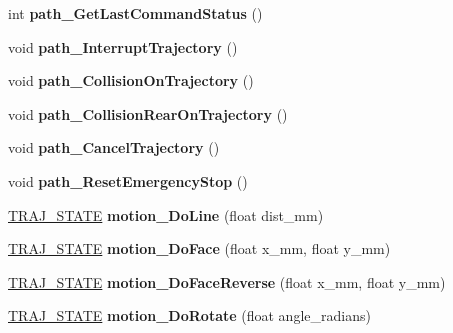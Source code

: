 \begin{DoxyCompactItemize}
\item 
\mbox{\label{classAsservN_a5dae80a7ffeae26c75751f9d7b362ee0}} 
int {\bfseries path\+\_\+\+Get\+Last\+Command\+Status} ()
\item 
\mbox{\label{classAsservN_a5d9332e9a4a1e13dd5fe7db3efce1871}} 
void {\bfseries path\+\_\+\+Interrupt\+Trajectory} ()
\item 
\mbox{\label{classAsservN_ae792ee21d684342dc24fa250626b6d4e}} 
void {\bfseries path\+\_\+\+Collision\+On\+Trajectory} ()
\item 
\mbox{\label{classAsservN_ad8864802fc5af8bdcc3adb36d41765b8}} 
void {\bfseries path\+\_\+\+Collision\+Rear\+On\+Trajectory} ()
\item 
\mbox{\label{classAsservN_a9183fcf2290bd2edcf13b741019dafa3}} 
void {\bfseries path\+\_\+\+Cancel\+Trajectory} ()
\item 
\mbox{\label{classAsservN_abbb9dda662c12fd5dca2fa89b670badd}} 
void {\bfseries path\+\_\+\+Reset\+Emergency\+Stop} ()
\item 
\mbox{\label{classAsservN_aa3f100a30f787da350a4a9e1cd35a9ea}} 
\hyperlink{path__manager_8h_adb3360abeb29758da93865c8afcb80eb}{T\+R\+A\+J\+\_\+\+S\+T\+A\+TE} {\bfseries motion\+\_\+\+Do\+Line} (float dist\+\_\+mm)
\item 
\mbox{\label{classAsservN_a64c4b711769055b61f75b47636d894bb}} 
\hyperlink{path__manager_8h_adb3360abeb29758da93865c8afcb80eb}{T\+R\+A\+J\+\_\+\+S\+T\+A\+TE} {\bfseries motion\+\_\+\+Do\+Face} (float x\+\_\+mm, float y\+\_\+mm)
\item 
\mbox{\label{classAsservN_ab1598b909531730c1c1ca5b4df5ada50}} 
\hyperlink{path__manager_8h_adb3360abeb29758da93865c8afcb80eb}{T\+R\+A\+J\+\_\+\+S\+T\+A\+TE} {\bfseries motion\+\_\+\+Do\+Face\+Reverse} (float x\+\_\+mm, float y\+\_\+mm)
\item 
\mbox{\label{classAsservN_ae2858d510206135f10dcf02cb44de1cd}} 
\hyperlink{path__manager_8h_adb3360abeb29758da93865c8afcb80eb}{T\+R\+A\+J\+\_\+\+S\+T\+A\+TE} {\bfseries motion\+\_\+\+Do\+Rotate} (float angle\+\_\+radians)

\end{DoxyCompactItemize}
